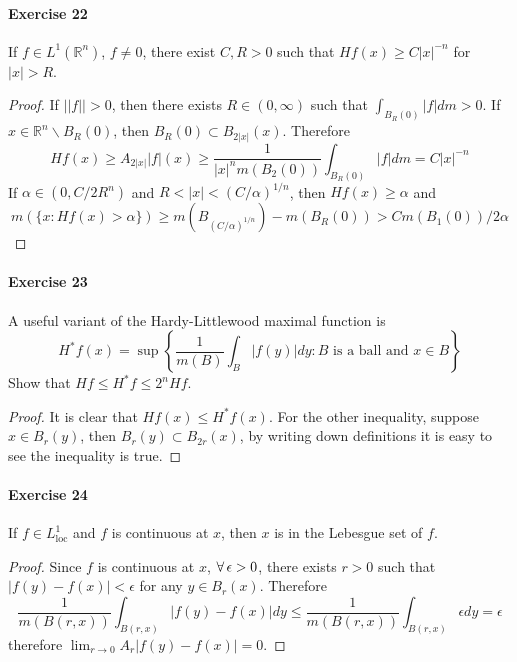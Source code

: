 \paragraph*{Exercise 22}
If $f\in L^1(\mathbb{R}^n)$, $f\neq 0$, there exist $C,R>0$ such that $Hf(x)\ge C|x|^{-n}$ for $|x|>R$.
\begin{proof}
    If $||f||>0$, then there exists $R\in(0,\infty)$ such that $\int_{B_R(0)}|f|dm>0$. If $x\in\mathbb{R}^n\backslash B_R(0)$, then $B_R(0)\subset B_{2|x|}(x)$. Therefore
    $$
    Hf(x)\ge A_{2|x|}|f|(x)\ge \dfrac{1}{|x|^nm(B_2(0))}\int_{B_R(0)}|f|dm=C|x|^{-n}
    $$
    If $\alpha\in(0,C/2R^n)$ and $R<|x|<(C/\alpha)^{1/n}$, then $Hf(x)\ge\alpha$ and
    $$
    m(\{x:Hf(x)>\alpha\})\ge m(B_{(C/\alpha)^{1/n}})-m(B_R(0))>Cm(B_1(0))/2\alpha
    $$
\end{proof}
\paragraph*{Exercise 23}
A useful variant of the Hardy-Littlewood maximal function is
$$
H^*f(x)=\sup\left\{\dfrac{1}{m(B)}\int_B|f(y)|dy:\text{$B$ is a ball and $x\in B$}\right\}
$$
Show that $Hf\le H^*f\le 2^n Hf$.
\begin{proof}
    It is clear that $Hf(x)\le H^*f(x)$. For the other inequality, suppose $x\in B_r(y)$, then $B_r(y)\subset B_{2r}(x)$, by writing down definitions it is easy to see the inequality is true.
\end{proof}

\paragraph*{Exercise 24}
If $f\in L^1_{\mathrm{loc}}$ and $f$ is continuous at $x$, then $x$ is in the Lebesgue set of $f$.
\begin{proof}
    Since $f$ is continuous at $x$, $\forall\,\epsilon>0$, there exists $r>0$ such that $|f(y)-f(x)|<\epsilon$ for any $y\in B_r(x)$. Therefore
    $$
    \dfrac{1}{m(B(r,x))}\int_{B(r,x)}|f(y)-f(x)|dy\le\dfrac{1}{m(B(r,x))}\int_{B(r,x)}\epsilon dy=\epsilon
    $$
    therefore $\lim_{r\to 0}A_r|f(y)-f(x)|=0$.
\end{proof}
